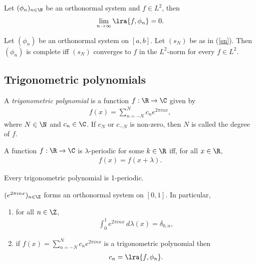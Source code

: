 \documentclass{article}
\begin{document}
\begin{corollary}
	Let $(\phi_n)_{n\in\N}$ be an orthonormal system and $f\in L^2$, then
	\begin{align*}
		\lim_{n\to\infty} \lra{f,\phi_n}=0.
	\end{align*}
\end{corollary}

\begin{theorem}[Notes 5.4]
	Let $(\phi_n)$ be an orthonormal system on $[a,b]$. Let $(s_N)$ be as in (\ref{sn}).
	Then $(\phi_n)$ is complete iff $(s_N)$ converges to $f$ in the $L^2$-norm
	for every $f\in L^2$.
\end{theorem}

\subsection{Trigonometric polynomials}

\begin{definition}
	A \emph{trigonometric polynomial} is a function $f:\R\to\C$ given by
	\begin{align*}
		f(x) = \sum_{n=-N}^N c_ne^{2\pi i n x},
	\end{align*}
	where $N\in\N$ and $c_n\in\C$. If $c_N$ or $c_{-N}$ is non-zero, then $N$ is called the
	degree of $f$.
\end{definition}

\begin{definition}
	A function $f:\R\to\C$ is $\lambda$-periodic for some $k\in\R$ iff,
	for all $x\in\R$,
	\begin{align*}
		f(x) = f(x + \lambda).
	\end{align*}
\end{definition}

\begin{lemma}
	Every trigonometric polynomial is 1-periodic.
\end{lemma}

\begin{lemma}[Notes 5.1]
	$(e^{2\pi inx})_{n\in\Z}$ forms an orthonormal system on $[0,1]$. In particular,
	\begin{enumerate}
		\item for all $n\in\Z$, \begin{align*}
			      \int_0^1 e^{2\pi inx}\:d\lambda(x) = \delta_{0,n},
		      \end{align*}
		\item if $f(x)=\sum_{n=-N}^N c_ne^{2\pi inx}$ is a trigonometric polynomial
		      then \begin{align*}
			      c_n = \lra{f,\phi_n}.
		      \end{align*}
	\end{enumerate}
\end{lemma}
\end{document}
